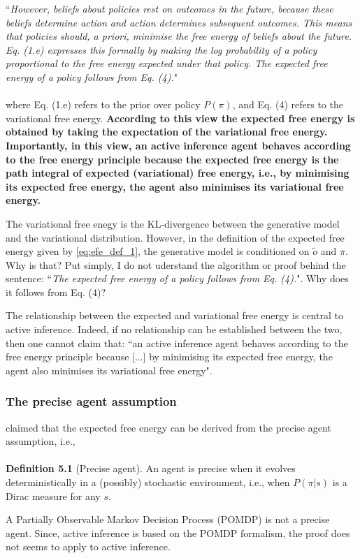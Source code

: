 \documentclass[twoside,11pt]{article}
\begin{document}
\noindent ``\textit{However, beliefs about policies rest on outcomes in the future, because these beliefs determine action and action determines subsequent outcomes. This means that policies should, a priori, minimise the free energy of beliefs about the future. Eq. (1.e) expresses this formally by making the log probability of a policy proportional to the free energy expected under that policy. The expected free energy of a policy follows from Eq. (4).}"
\\
\\
\noindent where Eq. (1.e) refers to the prior over policy $P(\pi)$, and Eq. (4) refers to the variational free energy. \textbf{According to this view the expected free energy is obtained by taking the expectation of the variational free energy. Importantly, in this view, an active inference agent behaves according to the free energy principle because the expected free energy is the path integral of expected (variational) free energy, i.e., by minimising its expected free energy, the agent also minimises its variational free energy.}
\\

\begin{myremark}{}{}
The variational free enegy is the KL-divergence between the generative model and the variational distribution. However, in the definition of the expected free energy given by \eqref{eq:efe_def_1}, the generative model is conditioned on $\tilde{o}$ and $\pi$. Why is that? Put simply, I do not uderstand the algorithm or proof behind the sentence: ``\textit{The expected free energy of a policy follows from Eq. (4).}". Why does it follows from Eq. (4)?
\end{myremark}

\begin{myremark}{}{}
The relationship between the expected and variational free energy is central to active inference. Indeed, if no relationship can be established between the two, then one cannot claim that: ``an active inference agent behaves according to the free energy principle because [...] by minimising its expected free energy, the agent also minimises its variational free energy".
\end{myremark}

\subsubsection{The precise agent assumption}

\citet{barp2022geometric} claimed that the expected free energy can be derived from the precise agent assumption, i.e.,
\\
\\
\noindent \textbf{Definition 5.1} (Precise agent). An agent is precise when it evolves deterministically in a (possibly) stochastic environment, i.e., when $P(\pi | s)$ is a Dirac measure for any $s$.
\vspace{0.1cm}
\begin{myremark}{}{}
A Partially Observable Markov Decision Process (POMDP) is not a precise agent. Since, active inference is based on the POMDP formalism, the proof does not seems to apply to active inference.
\end{myremark}
\end{document}
